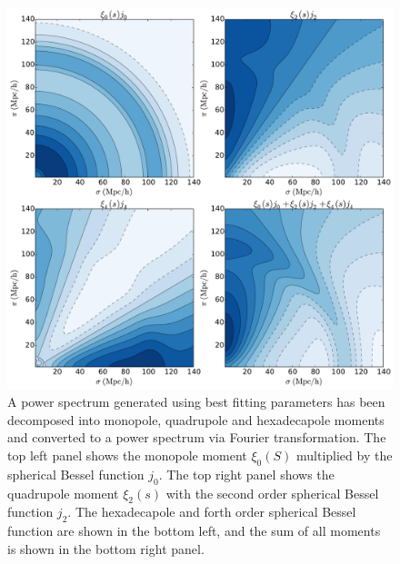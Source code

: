 \documentclass[titlesmallcaps, examinerscopy, copyrightpage]{uqthesis}
\begin{document}
\begin{figure}[h!]
  \begin{center}
    \includegraphics[width=\textwidth]{images/xi2d.pdf}
  \end{center}
  \caption{A power spectrum generated using best fitting \citet{Planck201416} parameters has been decomposed into monopole, quadrupole and hexadecapole moments and converted to a power spectrum via Fourier transformation. The top left panel shows the monopole moment $\xi_0(S)$ multiplied by the spherical Bessel function $j_0$. The top right panel shows the quadrupole moment $\xi_2(s)$ with the second order spherical Bessel function $j_2$. The hexadecapole and forth order spherical Bessel function are shown in the bottom left, and the sum of all moments is shown in the bottom right panel.}
  \label{fig:xi2d}
\end{figure}
\end{document}
